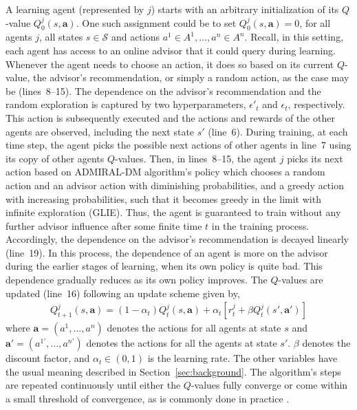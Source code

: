 \documentclass[jair, twoside,11pt,theapa]{article}
\begin{document}
A learning agent (represented by $j$) starts with an arbitrary initialization of its  $Q$-value $Q^j_0(s, \boldsymbol{a})$. One such assignment could be to set $Q^j_0(s, \boldsymbol{a}) = 0$, for all agents $j$, all states $s \in \mathcal{S}$ and actions $a^1 \in A^1, \ldots, a^n \in A^n$. Recall, in this setting, each agent has access to an online advisor that it could query during learning. Whenever the agent needs to choose an action, it does so based on its current $Q$-value, the advisor's recommendation, or simply a random action, as the case may be (lines~8--15). The dependence on the advisor's recommendation and the random exploration is captured by two hyperparameters, $\epsilon'_t$ and $\epsilon_t$, respectively. This action is subsequently executed and the actions and rewards of the other agents are observed, including the next state $s'$ (line~6). During training, at each time step, the agent picks the possible next actions of other agents in line~7 using its copy of other agents $Q$-values. Then, in lines~8--15, the agent $j$ picks its next action based on ADMIRAL-DM algorithm's policy which chooses a random action and an advisor action with diminishing probabilities, and a greedy action with increasing probabilities, such that it becomes greedy in the limit with infinite exploration (GLIE). Thus, the agent is guaranteed to train without any further advisor influence after some finite time $t$ in the training process. Accordingly, the dependence on the advisor's recommendation is decayed linearly (line~19). In this process, the dependence of an agent is more on the advisor during the earlier stages of learning, when its own policy is quite bad. This dependence gradually reduces as its own policy improves. The $Q$-values are updated (line~16) following an update scheme given by, 
\begin{equation}\label{Eq:qupdate}
    \begin{array}{l}
         Q^j_{t+1}(s,\boldsymbol{a})  =  (1-\alpha_t)Q_t^j(s,\boldsymbol{a}) +
         \alpha_t[r_t^j + \beta Q^j_{t}(s', \boldsymbol{a'})]
    \end{array}
\end{equation}
where $\boldsymbol{a} = ( a^{1}, \ldots, a^{n}) $ denotes the actions for all agents at state $s$ and $ \boldsymbol{a'} = (a^{1'}, \ldots, a^{n'})$ denotes the actions for all the agents at state $s'$. $\beta$ denotes the discount factor, and $\alpha_t \in (0,1)$ is the learning rate. The other variables have the usual meaning described in Section~\ref{sec:background}. The algorithm's steps are repeated continuously until either the $Q$-values fully converge or come within a small threshold of convergence, as is commonly done in practice \citep{sutton1998introduction}. 
\end{document}
